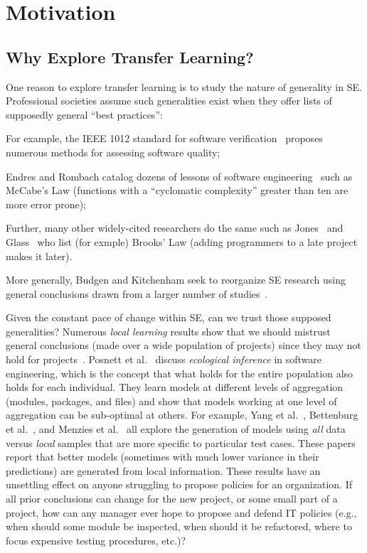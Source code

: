 
\section{Motivation}
\label{sec:Motivation}

\subsection{Why Explore Transfer Learning?}
One reason to explore transfer learning
is to study the nature of
generality in SE. Professional
societies assume such generalities exist when they
offer lists of supposedly general ``best practices'':
\squishlist
\item For example, the  IEEE 1012 standard for software
  verification~\cite{1012} proposes numerous methods for assessing software quality;
\item
 Endres and Rombach catalog
dozens of lessons of software
engineering~\cite{endres03} such as McCabe's Law (functions with a ``cyclomatic complexity'' greater
than ten are more error prone);
\item Further, many other
widely-cited researchers do the same such as Jones~\cite{jones10} and
Glass~\cite{glass02} who list (for exmple)
Brooks' Law (adding programmers to a late project makes it later).
\item
  More generally, Budgen and Kitchenham seek to
reorganize SE research using general conclusions
drawn from a larger number of
studies~\cite{budgen06,budgen09}.
\squishend

Given the constant pace of change within SE, can we trust
those supposed generalities?
Numerous {\em local learning} results show that we
should mistrust general conclusions (made over a
wide population of projects) since they may not hold
for projects~\cite{me12d,betten14}. Posnett et al.~\cite{posnett11}
discuss {\em ecological inference} in software
engineering, which is the concept that what holds
for the entire population also holds for each
individual. They learn models at different levels
of aggregation (modules, packages, and files) and show
that models working at one level of aggregation
can be sub-optimal at others.  For example, Yang et
al.~\cite{yang11}, Bettenburg et
al.~\cite{betten14}, and Menzies et al.~\cite{me12d}
all explore the generation of models using {\em all}
data versus {\em local} samples that are more specific
to particular test cases. These papers report that
better models (sometimes with much lower variance in
their predictions) are generated from local
information.
These results have an unsettling effect on anyone
struggling to propose policies for an organization.
If all prior conclusions can change for the new
project, or some small part of a project, how can
any manager ever hope to propose and defend IT
policies (e.g., when should some module be inspected,
when should it be refactored, where to focus
expensive testing procedures, etc.)?

